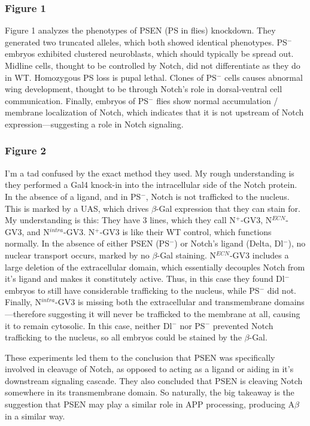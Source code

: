 \documentclass[12pt]{report}
\newcommand{\be}{\beta}
\begin{document}
\subsubsection*{Figure 1} Figure 1 analyzes the phenotypes of PSEN (PS in flies) knockdown. They generated two truncated alleles, which both showed identical phenotypes. PS$^-$ embryos exhibited clustered neuroblasts, which should typically be spread out. Midline cells, thought to be controlled by Notch, did not differentiate as they do in WT. Homozygous PS loss is pupal lethal. Clones of PS$^-$ cells causes abnormal wing development, thought to be through Notch's role in dorsal-ventral cell communication. Finally, embryos of PS$^-$ flies show normal accumulation / membrane localization of Notch, which indicates that it is not upstream of Notch expression---suggesting a role in Notch signaling. 

\subsubsection*{Figure 2} I'm a tad confused by the exact method they used. My rough understanding is they performed a Gal4 knock-in into the intracellular side of the Notch protein. In the absence of a ligand, and in PS$^-$, Notch is not trafficked to the nucleus. This is marked by a UAS, which drives $\beta$-Gal expression that they can stain for. My understanding is this: They have 3 lines, which they call N$^+$-GV3, N$^{ECN}$-GV3, and N$^{intra}$-GV3. N$^+$-GV3 is like their WT control, which functions normally. In the absence of either PSEN (PS$^-$) or Notch's ligand (Delta, Dl$^-$), no nuclear transport occurs, marked by no $\beta$-Gal staining. N$^{ECN}$-GV3 includes a large deletion of the extracellular domain, which essentially decouples Notch from it's ligand and makes it constitutely active. Thus, in this case they found Dl$^-$ embryos to still have considerable trafficking to the nucleus, while PS$^-$ did not. Finally, N$^{intra}$-GV3 is missing both the extracellular and transmembrane domains---therefore suggesting it will never be trafficked to the membrane at all, causing it to remain cytosolic. In this case, neither Dl$^-$ nor PS$^-$ prevented Notch trafficking to the nucleus, so all embryos could be stained by the $\be$-Gal.\newline

These experiments led them to the conclusion that PSEN was specifically involved in cleavage of Notch, as opposed to acting as a ligand or aiding in it's downstream signaling cascade. They also concluded that PSEN is cleaving Notch somewhere in its transmembrane domain. So naturally, the big takeaway is the suggestion that PSEN may play a similar role in APP processing, producing A$\be$ in a similar way. 
\end{document}
